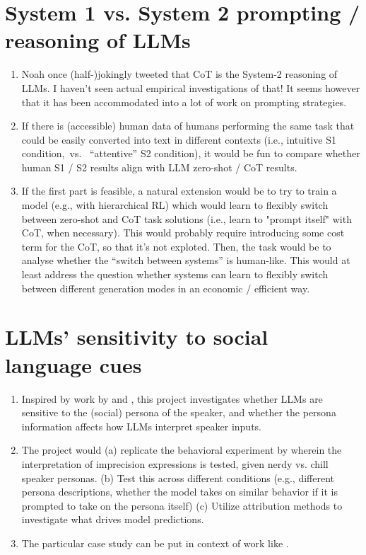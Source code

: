\documentclass[fleqn,reqno,10pt]{article}
\begin{document}
\section{System 1 vs. System 2 prompting / reasoning of LLMs}
\begin{enumerate}
	\item Noah once (half-)jokingly tweeted that CoT is the System-2 reasoning of LLMs. I haven't seen actual empirical investigations of that! It seems however that it has been accommodated into a lot of work on prompting strategies.
	\item If there is (accessible) human data of humans performing the same task that could be easily converted into text in different contexts (i.e., intuitive S1 condition,~vs.~ ``attentive'' S2 condition), it would be fun to compare whether human S1 / S2 results align with LLM zero-shot / CoT results.
	\item If the first part is feasible, a natural extension would be to try to train a model (e.g., with hierarchical RL) which would learn to flexibly switch between zero-shot and CoT task solutions (i.e., learn to "prompt itself" with CoT, when necessary). This would probably require introducing some cost term for the CoT, so that it's not exploted. Then, the task would be to analyse whether the ``switch between systems'' is human-like.  This would at least address the question whether systems can learn to flexibly switch between different generation modes in an economic / efficient way.
\end{enumerate}

\section{LLMs' sensitivity to social language cues}
\begin{enumerate}
	\item Inspired by work by \citet{burnett2019signalling} and \citet{beltrama2021imprecision}, this project investigates whether LLMs are sensitive to the (social) persona of the speaker, and whether the persona information affects how LLMs interpret speaker inputs.  
	\item The project would (a) replicate the behavioral experiment by \citet{beltrama2021imprecision} wherein the interpretation of imprecision expressions is tested, given nerdy vs. chill speaker personas. (b) Test this across different conditions (e.g., different persona descriptions, whether the model takes on similar behavior if it is prompted to take on the persona itself) (c) Utilize attribution methods to investigate what drives model predictions.
	\item The particular case study can be put in context of work like \citet{liu2024largelanguagemodelsnavigate}.
\end{enumerate}
\end{document}
